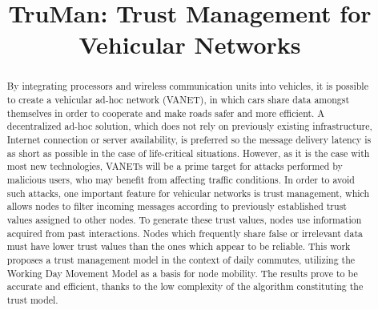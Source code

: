 \documentclass[conference]{IEEEtran}
\begin{document}
\title{TruMan: Trust Management for Vehicular Networks}



\author{
}


\maketitle

\begin{abstract}
By integrating processors and wireless communication units into vehicles, it is possible to create a vehicular ad-hoc network (VANET), in which cars share data amongst themselves in order to cooperate and make roads safer and more efficient.
A decentralized ad-hoc solution, which does not rely on previously existing infrastructure, Internet connection or server availability, is preferred so the message delivery latency is as short as possible in the case of life-critical situations.
However, as it is the case with most new technologies, VANETs will be a prime target for attacks performed by malicious users, who may benefit from affecting traffic conditions.
In order to avoid such attacks, one important feature for vehicular networks is trust management, which allows nodes to filter incoming messages according to previously established trust values assigned to other nodes.
To generate these trust values, nodes use information acquired from past interactions. Nodes which frequently share false or irrelevant data must have lower trust values than the ones which appear to be reliable.
This work proposes a trust management model in the context of daily commutes, utilizing the Working Day Movement Model as a basis for node mobility.
The results prove to be accurate and efficient, thanks to the low complexity of the algorithm constituting the trust model.
\end{abstract}
\end{document}
